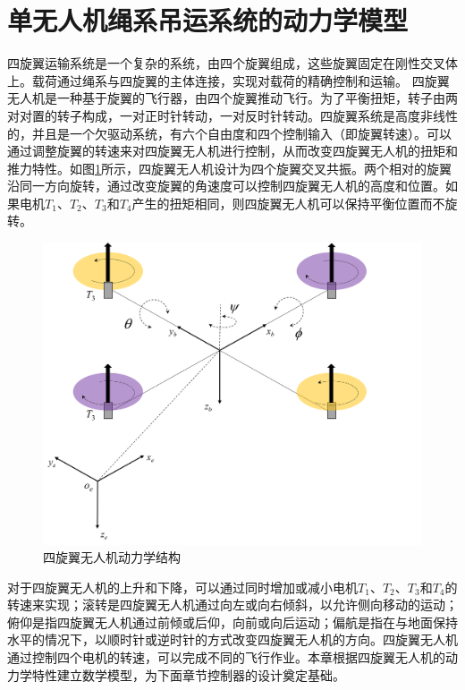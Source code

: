 \documentclass[lang=chs, degree=master, blindreview=false, winfonts=true]{yanputhesis}
\begin{document}
\section{单无人机绳系吊运系统的动力学模型}
四旋翼运输系统是一个复杂的系统，由四个旋翼组成，这些旋翼固定在刚性交叉体上。载荷通过绳系与四旋翼的主体连接，实现对载荷的精确控制和运输。
四旋翼无人机是一种基于旋翼的飞行器，由四个旋翼推动飞行。为了平衡扭矩，转子由两对对置的转子构成，一对正时针转动，一对反时针转动。四旋翼系统是高度非线性的，并且是一个欠驱动系统，有六个自由度和四个控制输入（即旋翼转速）。可以通过调整旋翼的转速来对四旋翼无人机进行控制，从而改变四旋翼无人机的扭矩和推力特性。如图\ref{2_1}所示，四旋翼无人机设计为四个旋翼交叉共振。两个相对的旋翼沿同一方向旋转，通过改变旋翼的角速度可以控制四旋翼无人机的高度和位置。如果电机$T_1$、$T_2$、$T_3$和$T_4$产生的扭矩相同，则四旋翼无人机可以保持平衡位置而不旋转。

\begin{figure}[hbt!]
	\centering
	\includegraphics[width=28pc]{picture/2_1.png} 
	\caption{四旋翼无人机动力学结构} \label{2_1}
\end{figure}


对于四旋翼无人机的上升和下降，可以通过同时增加或减小电机$T_1$、$T_2$、$T_3$和$T_4$的转速来实现；滚转是四旋翼无人机通过向左或向右倾斜，以允许侧向移动的运动；俯仰是指四旋翼无人机通过前倾或后仰，向前或向后运动；偏航是指在与地面保持水平的情况下，以顺时针或逆时针的方式改变四旋翼无人机的方向。四旋翼无人机通过控制四个电机的转速，可以完成不同的飞行作业。本章根据四旋翼无人机的动力学特性建立数学模型，为下面章节控制器的设计奠定基础。
\end{document}
